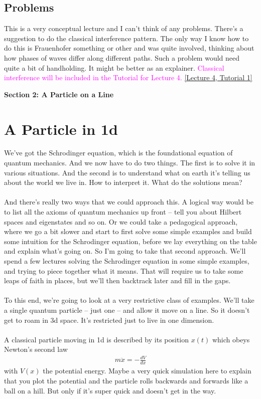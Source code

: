 \documentclass[12pt]{article}
\def\be{\begin{eqnarray}}
\def\ee{\end{eqnarray}}
\newcommand{\nn}{\nonumber}
\newcommand\para{\paragraph{}}
\newcommand{\alyssa}{\textcolor{magenta}}
\begin{document}
\subsection{Problems}

{\color{blue} This is a very conceptual lecture and I can't think of any problems. There's a suggestion to do the classical interference pattern. The only way I know how to do this is Frauenhofer something or other and was quite involved, thinking about how phases of waves differ along different paths. Such a problem would need quite a bit of handholding. It might be better as an explainer. } \alyssa{Classical interference will be included in the Tutorial for Lecture 4.} \href{https://drive.google.com/file/d/1SRmv_wbY5g6IYCpOA7z6lYqfwOQ5H9WR/view?usp=drive_link}{[Lecture 4, Tutorial 1]}


\newpage
\noindent
{\Large \bf Section 2: A Particle on a Line}


\section{A Particle in 1d}

We've got the Schrodinger equation, which is the foundational equation of quantum mechanics. And we now have to do two things. The first is to solve it in various situations. And the second is to understand what on earth it's telling us about the world we live in. How to interpret it. What do the solutions mean? 

\para
And there's really two ways that we could approach this. A logical way would be to list all the axioms of quantum mechanics up front -- tell you about Hilbert spaces and eigenstates and so on. Or we could take a pedagogical approach, where we go a bit slower and start to first solve some simple examples and build some intuition for the Schrodinger equation, before we lay everything  on the table and explain what's going on. So I'm going to take that second approach. We'll spend a few lectures solving the Schrodinger equation in some simple examples, and trying to piece together what it means. That will require us to take some leaps of faith in places, but we'll then backtrack later and fill in the gaps.

\para
To this end, we're going to look at a very restrictive class of examples. We'll take a single quantum particle -- just one -- and allow it move on a line. So it doesn't get to roam in 3d space. It's restricted just to live in one dimension.

\para
{\color{olive}A classical particle moving in 1d is described by its position $x(t)$ which obeys Newton's second law
\be m\ddot{x} = -\frac{dV}{dx}\nn\ee
%
with $V(x)$ the potential energy.} {\color{blue} Maybe a very quick simulation here to explain that you plot the potential and the particle rolls backwards and forwards like a ball on a hill. But only if it's super quick and doesn't get in the way.}
\end{document}
